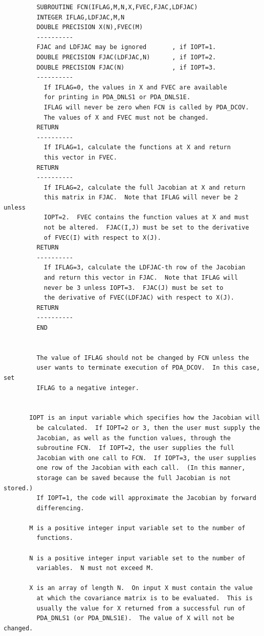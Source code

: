 \documentclass[11pt,twoside]{article}
\begin{document}
\begin{verbatim}
         SUBROUTINE FCN(IFLAG,M,N,X,FVEC,FJAC,LDFJAC)
         INTEGER IFLAG,LDFJAC,M,N
         DOUBLE PRECISION X(N),FVEC(M)
         ----------
         FJAC and LDFJAC may be ignored       , if IOPT=1.
         DOUBLE PRECISION FJAC(LDFJAC,N)      , if IOPT=2.
         DOUBLE PRECISION FJAC(N)             , if IOPT=3.
         ----------
           If IFLAG=0, the values in X and FVEC are available
           for printing in PDA_DNLS1 or PDA_DNLS1E.
           IFLAG will never be zero when FCN is called by PDA_DCOV.
           The values of X and FVEC must not be changed.
         RETURN
         ----------
           If IFLAG=1, calculate the functions at X and return
           this vector in FVEC.
         RETURN
         ----------
           If IFLAG=2, calculate the full Jacobian at X and return
           this matrix in FJAC.  Note that IFLAG will never be 2 unless
           IOPT=2.  FVEC contains the function values at X and must
           not be altered.  FJAC(I,J) must be set to the derivative
           of FVEC(I) with respect to X(J).
         RETURN
         ----------
           If IFLAG=3, calculate the LDFJAC-th row of the Jacobian
           and return this vector in FJAC.  Note that IFLAG will
           never be 3 unless IOPT=3.  FJAC(J) must be set to
           the derivative of FVEC(LDFJAC) with respect to X(J).
         RETURN
         ----------
         END


         The value of IFLAG should not be changed by FCN unless the
         user wants to terminate execution of PDA_DCOV.  In this case, set
         IFLAG to a negative integer.


       IOPT is an input variable which specifies how the Jacobian will
         be calculated.  If IOPT=2 or 3, then the user must supply the
         Jacobian, as well as the function values, through the
         subroutine FCN.  If IOPT=2, the user supplies the full
         Jacobian with one call to FCN.  If IOPT=3, the user supplies
         one row of the Jacobian with each call.  (In this manner,
         storage can be saved because the full Jacobian is not stored.)
         If IOPT=1, the code will approximate the Jacobian by forward
         differencing.

       M is a positive integer input variable set to the number of
         functions.

       N is a positive integer input variable set to the number of
         variables.  N must not exceed M.

       X is an array of length N.  On input X must contain the value
         at which the covariance matrix is to be evaluated.  This is
         usually the value for X returned from a successful run of
         PDA_DNLS1 (or PDA_DNLS1E).  The value of X will not be changed.


\end{verbatim}
\end{document}
